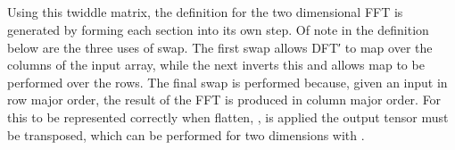 \begin{code}%
%
\>[2]\AgdaSpace{}%
\AgdaSymbol{:}\AgdaSpace{}%
\AgdaSpace{}%
\AgdaSymbol{(}\AgdaSpace{}%
\AgdaSpace{}%
\AgdaSpace{}%
\AgdaSpace{}%
\AgdaSymbol{)}\AgdaSpace{}%
\<%
\\
%
\>[2]\AgdaSpace{}%
\AgdaSymbol{\{}\AgdaSymbol{\}}\AgdaSpace{}%
\AgdaSymbol{\{}\AgdaSymbol{\}}\AgdaSpace{}%
\AgdaSymbol{(}\AgdaSpace{}%
\AgdaSpace{}%
\AgdaSymbol{)}\AgdaSpace{}%
\AgdaSymbol{=}\AgdaSpace{}%
\AgdaSpace{}%
\AgdaSymbol{(}\AgdaSpace{}%
\AgdaSpace{}%
\AgdaSymbol{)}\AgdaSpace{}%
\AgdaSymbol{(}\AgdaSpace{}%
\AgdaSpace{}%
\AgdaSpace{}%
\AgdaSpace{}%
\AgdaSpace{}%
\AgdaSymbol{)}\<%
\end{code}
\begin{code}[hide]%
\>[2][@{}l@{\AgdaIndent{1}}]%
\>[6]\<%
\\
\>[6][@{}l@{\AgdaIndent{0}}]%
\>[8]\<%
\\
\>[8][@{}l@{\AgdaIndent{0}}]%
\>[10]\<%
\\
\>[10][@{}l@{\AgdaIndent{0}}]%
\>[12]\AgdaSymbol{\AgdaUnderscore{}}\AgdaSpace{}%
\AgdaSymbol{:}\AgdaSpace{}%
\AgdaSpace{}%
\AgdaSymbol{(}\AgdaSpace{}%
\AgdaSpace{}%
\AgdaSymbol{)}\<%
\end{code}

Using this twiddle matrix, the definition for the two dimensional FFT is generated
by forming each section into its own step.
Of note in the definition below are the three uses of swap.
The first swap allows DFT′ to map over the columns of the input array,
while the next inverts this and allows map to be performed over the rows.
The final swap is performed because, given an input in row major order, the 
result of the FFT is produced in column major order. 
For this to be represented correctly when flatten, , is applied the output
tensor must be transposed, which can be performed for two dimensions with .

